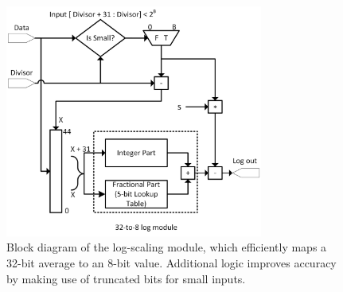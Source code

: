 \begin{figure}[t]
\begin{center}
\includegraphics[width=20pc]{figures/vpm_figures/log2_v5.png}

\caption[Block diagram of the fixed-point log scaling module]{Block diagram of the log-scaling module, which efficiently maps a 32-bit average to an 8-bit value. Additional logic improves accuracy by making use of truncated bits for small inputs.}
\label{fig:logscaling}
\end{center}
\end{figure}

